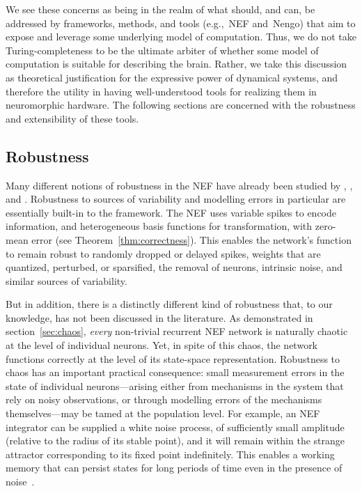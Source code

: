 We see these concerns as being in the realm of what should, and can, be addressed by frameworks, methods, and tools (e.g.,~NEF and~Nengo) that aim to expose and leverage some underlying model of computation.
Thus, we do not take Turing-completeness to be the ultimate arbiter of whether some model of computation is suitable for describing the brain.
Rather, we take this discussion as theoretical justification for the expressive power of dynamical systems, and therefore the utility in having well-understood tools for realizing them in neuromorphic hardware.
The following sections are concerned with the robustness and extensibility of these tools.

\subsection{Robustness}
\label{sec:nef-robustness}

Many different notions of robustness in the NEF have already been studied by \citet{eliasmith2003a}, \citet{eliasmith2012}, and \citet{eliasmith2013build}.
Robustness to sources of variability and modelling errors in particular are essentially built-in to the framework.
The NEF uses variable spikes to encode information, and heterogeneous basis functions for transformation, with zero-mean error (see Theorem~\ref{thm:correctness}).
This enables the network's function to remain robust to randomly dropped or delayed spikes, weights that are quantized, perturbed, or sparsified, the removal of neurons, intrinsic noise, and similar sources of variability.

But in addition, there is a distinctly different kind of robustness that, to our knowledge, has not been discussed in the literature.
As demonstrated in section~\ref{sec:chaos}, \emph{every} non-trivial recurrent NEF network is naturally chaotic at the level of individual neurons.
Yet, in spite of this chaos, the network functions correctly at the level of its state-space representation.
Robustness to chaos has an important practical consequence: small measurement errors in the state of individual neurons---arising either from mechanisms in the system that rely on noisy observations, or through modelling errors of the mechanisms themselves---may be tamed at the population level. 
For example, an NEF integrator can be supplied a white noise process, of sufficiently small amplitude (relative to the radius of its stable point), and it will remain within the strange attractor corresponding to its fixed point indefinitely. 
This enables a working memory that can persist states for long periods of time even in the presence of noise~\citep{singh2004}.

